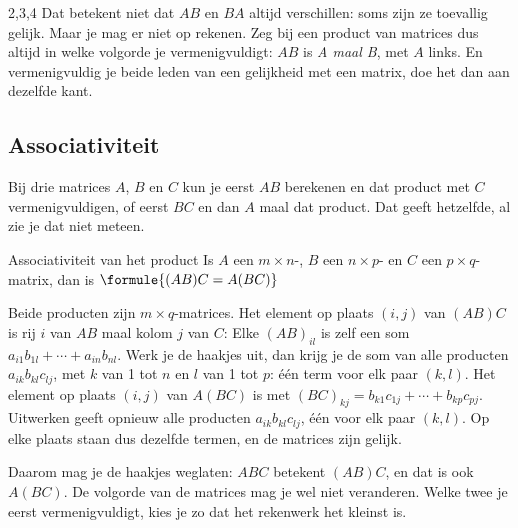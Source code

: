 \begin{alleenvoor}{2,3,4}
Dat betekent niet dat $AB$ en $BA$ altijd verschillen: soms zijn ze toevallig gelijk. Maar je mag er niet op rekenen. Zeg bij een product van matrices dus altijd in welke volgorde je vermenigvuldigt: $AB$ is \textit{A maal B}, met $A$ links. En vermenigvuldig je beide leden van een gelijkheid met een matrix, doe het dan aan dezelfde kant.

\subsection{Associativiteit}

Bij drie matrices $A$, $B$ en $C$ kun je eerst $AB$ berekenen en dat product met $C$ vermenigvuldigen, of eerst $BC$ en dan $A$ maal dat product. Dat geeft hetzelfde, al zie je dat niet meteen.

\begin{theorie}
\begin{stelling}{Associativiteit van het product}
Is $A$ een $m \times n$-, $B$ een $n \times p$- en $C$ een $p \times q$-matrix, dan is \qquad $\formule{(AB)C = A(BC)}$
\end{stelling}

\begin{bewijs}
Beide producten zijn $m \times q$-matrices. Het element op plaats $(i, j)$ van $(AB)C$ is rij $i$ van $AB$ maal kolom $j$ van $C$:
Elke $(AB)_{il}$ is zelf een som $a_{i1}b_{1l} + \cdots + a_{in}b_{nl}$. Werk je de haakjes uit, dan krijg je de som van alle producten $a_{ik}b_{kl}c_{lj}$, met $k$ van 1 tot $n$ en $l$ van 1 tot $p$: één term voor elk paar $(k, l)$. Het element op plaats $(i, j)$ van $A(BC)$ is
met $(BC)_{kj} = b_{k1}c_{1j} + \cdots + b_{kp}c_{pj}$. Uitwerken geeft opnieuw alle producten $a_{ik}b_{kl}c_{lj}$, één voor elk paar $(k, l)$. Op elke plaats staan dus dezelfde termen, en de matrices zijn gelijk.
\end{bewijs}
\end{theorie}

Daarom mag je de haakjes weglaten: $ABC$ betekent $(AB)C$, en dat is ook $A(BC)$. De volgorde van de matrices mag je wel niet veranderen. Welke twee je eerst vermenigvuldigt, kies je zo dat het rekenwerk het kleinst is.


\end{alleenvoor}
